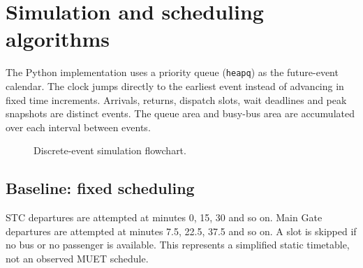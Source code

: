 \documentclass[conference]{IEEEtran}
\begin{document}
\section{Simulation and scheduling algorithms}
The Python implementation uses a priority queue (\texttt{heapq}) as the future-event calendar. The clock jumps directly to the earliest event instead of advancing in fixed time increments. Arrivals, returns, dispatch slots, wait deadlines and peak snapshots are distinct events. The queue area and busy-bus area are accumulated over each interval between events.
\begin{figure}[h]
\centering
{}
\caption{Discrete-event simulation flowchart.}
\end{figure}
\subsection{Baseline: fixed scheduling}
STC departures are attempted at minutes 0, 15, 30 and so on. Main Gate departures are attempted at minutes 7.5, 22.5, 37.5 and so on. A slot is skipped if no bus or no passenger is available. This represents a simplified static timetable, not an observed MUET schedule.
\end{document}
